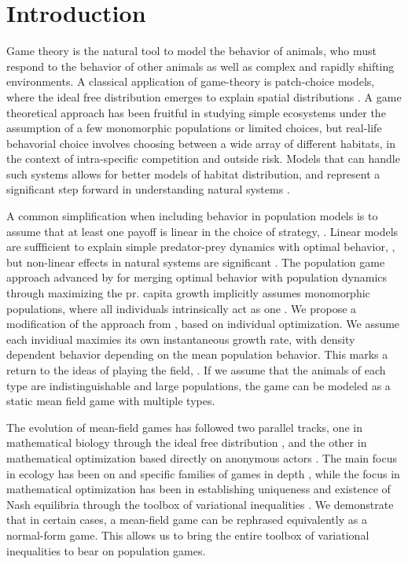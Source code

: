 \section{Introduction}

Game theory is the natural tool to model the behavior of animals, who must respond to the behavior of other animals as well as complex and rapidly shifting environments. A classical application of game-theory is patch-choice models, where the ideal free distribution emerges to explain spatial distributions  \citep{cressman2004ideal, fretwell1969territorial}. A game theoretical approach has been fruitful in studying simple ecosystems under the assumption of a few monomorphic populations or limited choices, but real-life behavorial choice involves choosing between a wide array of different habitats, in the context of intra-specific competition and outside risk. Models that can handle such systems allows for better models of habitat distribution, and represent a significant step forward in understanding natural systems \citep{morris2003shadows}.

A common simplification when including behavior in population models is to assume that at least one payoff is linear in the choice of strategy, \citep{krivan1997dynamic}. Linear models are suffficient to explain simple predator-prey dynamics with optimal behavior, \citep{kvrivan2007lotka}, but non-linear effects in natural systems are significant \citep{gross2009generalized}. The population game approach advanced by \citep{vincent2005evolutionary} for merging optimal behavior with population dynamics through maximizing the pr. capita growth implicitly assumes monomorphic populations, where all individuals intrinsically act as one \citep{malone2020ecology,stump2017optimally}. We propose a modification of the approach from \citep{vincent2005evolutionary}, based on individual optimization. We assume each invidiual maximies its own instantaneous growth rate, with density dependent behavior depending on the mean population behavior. This marks a return to the ideas of playing the field, \citep{smith1982evolution, cressman2010ideal}. If we assume that the animals of each type are indistinguishable and large populations, the game can be modeled as a static mean field game with multiple types.


The evolution of mean-field games has followed two parallel tracks, one in mathematical biology through the ideal free distribution \citep{fretwell1969territorial, cressman2004ideal, kvrivan2008ideal, cressman2010ideal}, and the other in mathematical optimization based directly on anonymous actors \citep{lasry2007mean, aumann1964markets, blanchet2016optimal}. The main focus in ecology has been on and specific families of games in depth \cite{broom2013game}, while the focus in mathematical optimization has been in establishing uniqueness and existence of Nash equilibria through the toolbox of variational inequalities \citep{karamardian1969nonlinear, gabay1980uniqueness, nabetani2011parametrized}. We demonstrate that in certain cases, a mean-field game can be rephrased equivalently as a normal-form game. This allows us to bring the entire toolbox of variational inequalities to bear on population games.


